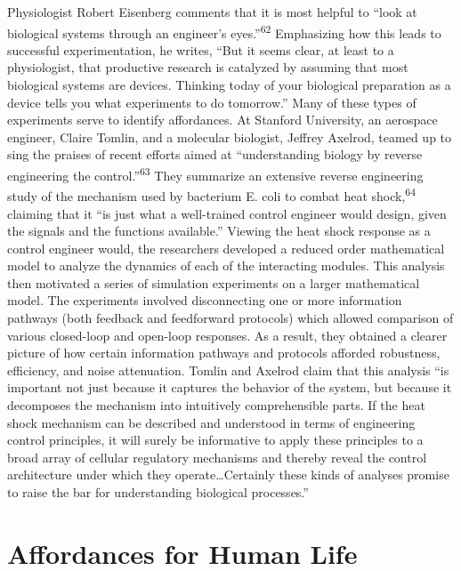 Physiologist Robert Eisenberg comments that it is most helpful to “look
at biological systems through an engineer’s eyes.”\textsuperscript{62}
Emphasizing how this leads to successful experimentation, he writes,
“But it seems clear, at least to a physiologist, that productive
research is catalyzed by assuming that most biological systems are
devices. Thinking today of your biological preparation as a device
tells you what experiments to do tomorrow.” Many of these types of
experiments serve to identify affordances. At Stanford University, an
aerospace engineer, Claire Tomlin, and a molecular biologist, Jeffrey
Axelrod, teamed up to sing the praises of recent efforts aimed at
“understanding biology by reverse engineering the
control.”\textsuperscript{63} They summarize an extensive reverse
engineering study of the mechanism used by bacterium E. coli to combat
heat shock,\textsuperscript{64} claiming that it “is just what a
well-trained control engineer would design, given the signals and the
functions available.” Viewing the heat shock response as a control
engineer would, the researchers developed a reduced order mathematical
model to analyze the dynamics of each of the interacting modules. This
analysis then motivated a series of simulation experiments on a larger
mathematical model. The experiments involved disconnecting one or more
information pathways (both feedback and feedforward protocols) which
allowed comparison of various closed-loop and open-loop responses. As a
result, they obtained a clearer picture of how certain information
pathways and protocols afforded robustness, efficiency, and noise
attenuation. Tomlin and Axelrod claim that this analysis “is important
not just because it captures the behavior of the system, but because it
decomposes the mechanism into intuitively comprehensible parts. If the
heat shock mechanism can be described and understood in terms of
engineering control principles, it will surely be informative to apply
these principles to a broad array of cellular regulatory mechanisms and
thereby reveal the control architecture under which they
operate…Certainly these kinds of analyses promise to raise the bar for
understanding biological processes.”

\section{Affordances for Human Life}

